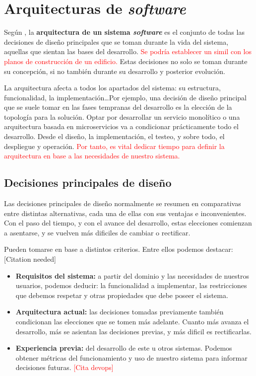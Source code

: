 \chapter{Arquitecturas de \textit{software}}

Según \cite{taylorSoftwareArchitectureFoundations2009}, la {\bf arquitectura de un sistema \textit{software}} es el conjunto de todas las decisiones de diseño principales que se toman durante la vida del sistema, aquellas que sientan las bases del desarrollo. \textcolor{red}{Se podría establecer un simil con los planos de construcción de un edificio.} Estas decisiones no solo se toman durante su concepción, si no también durante su desarrollo y posterior evolución.

La arquitectura afecta a todos los apartados del sistema: su estructura, funcionalidad, la implementación\dots Por ejemplo, una decisión de diseño principal que se suele tomar en las fases tempranas del desarrollo es la elección de la topología para la solución. Optar por desarrollar un servicio monolítico o una arquitectura basada en microservicios va a condicionar prácticamente todo el desarrollo. Desde el diseño, la implementación, el testeo, y sobre todo, el despliegue y operación. \textcolor{red}{Por tanto, es vital dedicar tiempo para definir la arquitectura en base a las necesidades de nuestro sistema.}

\section{Decisiones principales de diseño}

Las decisiones principales de diseño normalmente se resumen en comparativas entre distintas alternativas, cada una de ellas con sus ventajas e inconvenientes. Con el paso del tiempo, y con el avance del desarrollo, estas elecciones comienzan a asentarse, y se vuelven más dificiles de cambiar o rectificar.

Pueden tomarse en base a distintos criterios. Entre ellos podemos destacar: [Citation needed]

    \begin{itemize}
        \item \textbf{Requisitos del sistema:} a partir del dominio y las necesidades de nuestros usuarios, podemos deducir: la funcionalidad a implementar, las restricciones que debemos respetar y otras propiedades que debe poseer el sistema.

        \item \textbf{Arquitectura actual:} las decisiones tomadas previamente también condicionan las elecciones que se tomen más adelante. Cuanto más avanza el desarrollo, más se asientan las decisiones previas, y más dificil es rectificarlas.

        \item \textbf{Experiencia previa:} del desarrollo de este u otros sistemas. Podemos obtener métricas del funcionamiento y uso de nuestro sistema para informar decisiones futuras. \textcolor{red}{[Cita devops]}
    \end{itemize}

